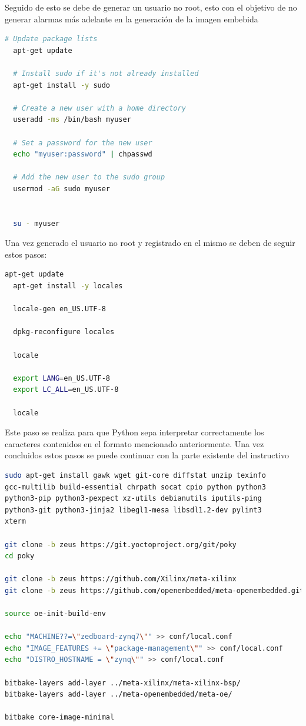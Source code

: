 \documentclass[12pt,letterpaper]{article}
\begin{document}
Seguido de esto se debe de generar un usuario no root, esto con el objetivo de no generar alarmas más adelante
en la generación de la imagen embebida

\begin{lstlisting}[language=bash]
  # Update package lists
  apt-get update
  
  # Install sudo if it's not already installed
  apt-get install -y sudo
  
  # Create a new user with a home directory
  useradd -ms /bin/bash myuser
  
  # Set a password for the new user
  echo "myuser:password" | chpasswd
  
  # Add the new user to the sudo group
  usermod -aG sudo myuser
  
  
  su - myuser
\end{lstlisting}

Una vez generado el usuario no root y registrado en el mismo se deben de seguir estos pasos:

\begin{lstlisting}[language=bash]
  apt-get update
  apt-get install -y locales
  
  locale-gen en_US.UTF-8
  
  dpkg-reconfigure locales
  
  locale
  
  export LANG=en_US.UTF-8
  export LC_ALL=en_US.UTF-8
  
  locale
\end{lstlisting}

Este paso se realiza para que Python sepa interpretar correctamente los caracteres contenidos en el formato mencionado
anteriormente.
Una vez concluidos estos pasos se puede continuar con la parte existente del instructivo 

\begin{lstlisting}[language=bash]
sudo apt-get install gawk wget git-core diffstat unzip texinfo 
gcc-multilib build-essential chrpath socat cpio python python3 
python3-pip python3-pexpect xz-utils debianutils iputils-ping 
python3-git python3-jinja2 libegl1-mesa libsdl1.2-dev pylint3
xterm

git clone -b zeus https://git.yoctoproject.org/git/poky
cd poky

git clone -b zeus https://github.com/Xilinx/meta-xilinx
git clone -b zeus https://github.com/openembedded/meta-openembedded.git

source oe-init-build-env

echo "MACHINE??=\"zedboard-zynq7\"" >> conf/local.conf
echo "IMAGE_FEATURES += \"package-management\"" >> conf/local.conf
echo "DISTRO_HOSTNAME = \"zynq\"" >> conf/local.conf

bitbake-layers add-layer ../meta-xilinx/meta-xilinx-bsp/
bitbake-layers add-layer ../meta-openembedded/meta-oe/

bitbake core-image-minimal
\end{lstlisting}
\end{document}
